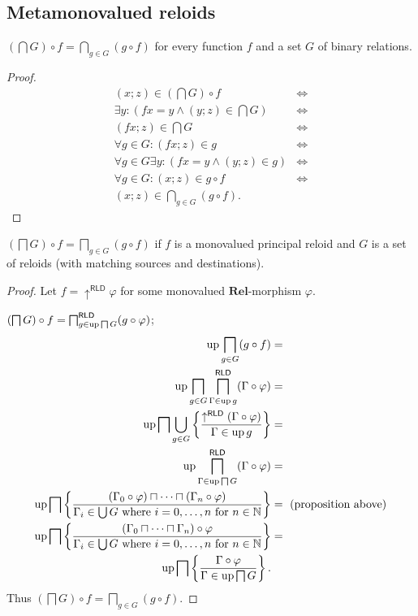\subsection{Metamonovalued reloids}
\begin{prop}
$\left(\bigcap G\right)\circ f=\bigcap_{g\in G}(g\circ f)$ for every
function $f$ and a set $G$ of binary relations.\end{prop}
\begin{proof}
~
\begin{align*}
(x;z)\in\left(\bigcap G\right)\circ f & \Leftrightarrow\\
\exists y:(fx=y\land(y;z)\in\bigcap G) & \Leftrightarrow\\
(fx;z)\in\bigcap G & \Leftrightarrow\\
\forall g\in G:(fx;z)\in g & \Leftrightarrow\\
\forall g\in G\exists y:(fx=y\land(y;z)\in g) & \Leftrightarrow\\
\forall g\in G:(x;z)\in g\circ f & \Leftrightarrow\\
(x;z)\in\bigcap_{g\in G}(g\circ f).
\end{align*}
\end{proof}
\begin{lem}
$\left(\bigsqcap G\right)\circ f=\bigsqcap_{g\in G}(g\circ f)$ if
$f$ is a monovalued principal reloid and $G$ is a set of reloids
(with matching sources and destinations).\end{lem}
\begin{proof}
Let $f=\uparrow^{\mathsf{RLD}}\varphi$ for some monovalued $\mathbf{Rel}$-morphism
$\varphi$.

$\left(\bigsqcap G\right)\circ f=\bigsqcap_{g\in\operatorname{up}\bigsqcap G}^{\mathsf{RLD}}(g\circ\varphi)$;
\begin{align*}
\operatorname{up}\bigsqcap_{g\in G}(g\circ f) & =\\
\operatorname{up}\bigsqcap_{g\in G}\bigsqcap_{\Gamma\in\operatorname{up} g}^{\mathsf{RLD}}(\Gamma\circ\varphi) & =\\
\operatorname{up}\bigsqcap\bigcup_{g\in G}\left\{ \frac{\uparrow^{\mathsf{RLD}}(\Gamma\circ\varphi)}{\Gamma\in\operatorname{up} g}\right\} & =\\
\operatorname{up}\bigsqcap_{\Gamma\in\operatorname{up}\bigsqcap G}^{\mathsf{RLD}}(\Gamma\circ\varphi) & =\\
\operatorname{up}\bigsqcap\left\{ \frac{(\Gamma_{0}\circ\varphi)\sqcap\dots\sqcap(\Gamma_{n}\circ\varphi)}{\Gamma_{i}\in\bigcup G\text{ where \ensuremath{i=0,\dots,n} for \ensuremath{n\in\mathbb{N}}}}\right\} & =\text{ (proposition above)}\\
\operatorname{up}\bigsqcap\left\{ \frac{(\Gamma_{0}\sqcap\dots\sqcap\Gamma_{n})\circ\varphi}{\Gamma_{i}\in\bigcup G\text{ where \ensuremath{i=0,\dots,n} for \ensuremath{n\in\mathbb{N}}}}\right\} & =\\
\operatorname{up}\bigsqcap\left\{ \frac{\Gamma\circ\varphi}{\Gamma\in\operatorname{up}\bigsqcap G}\right\}.
\end{align*}
Thus $\left(\bigsqcap G\right)\circ f=\bigsqcap_{g\in G}(g\circ f)$.\end{proof}
